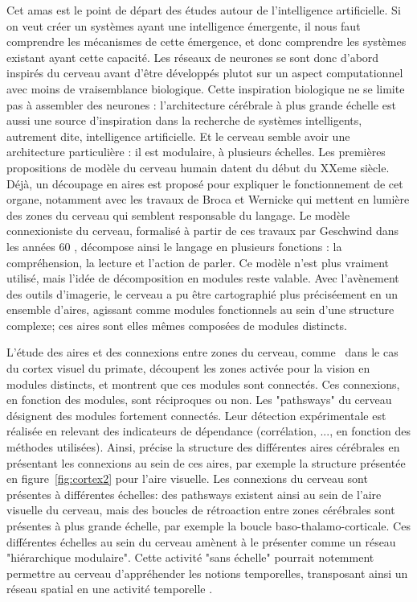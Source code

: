 Cet amas est le point de départ des études autour de l’intelligence artificielle. Si on veut créer un systèmes ayant une intelligence émergente, il nous faut comprendre les mécanismes de cette émergence, et donc comprendre les systèmes existant ayant cette capacité. Les réseaux de neurones se sont donc d’abord inspirés du cerveau avant d’être développés plutot sur un aspect computationnel avec moins de vraisemblance biologique.
Cette inspiration biologique ne se limite pas à assembler des neurones : l’architecture cérébrale à plus grande échelle est aussi une source d’inspiration dans la recherche de systèmes intelligents, autrement dite, intelligence artificielle.  
Et le cerveau semble avoir une architecture particulière : il est modulaire, à plusieurs échelles. 
Les premières propositions de modèle du cerveau humain datent du début du XXeme siècle. Déjà, un découpage en aires est proposé pour expliquer le fonctionnement de cet organe, notamment avec les travaux de Broca et Wernicke qui mettent en lumière des zones du cerveau qui semblent responsable du langage. Le modèle connexioniste du cerveau, formalisé à partir de ces travaux par Geschwind dans les années 60 , décompose ainsi le langage en plusieurs fonctions : la compréhension, la lecture et l'action de parler. Ce modèle n'est plus vraiment utilisé, mais l'idée de décomposition en modules reste valable.
Avec l'avènement des outils d'imagerie, le cerveau a pu être cartographié plus préciséement en un ensemble d'aires, agissant comme modules fonctionnels au sein d'une structure complexe; ces aires sont elles mêmes composées de modules distincts. 

L'étude des aires et des connexions entre zones du cerveau, comme~\cite{primate_cortex_91} dans le cas du cortex visuel du primate, découpent les zones activée pour la vision en modules distincts, et montrent que ces modules sont connectés. Ces connexions, en fonction des modules, sont réciproques ou non. Les "pathsways" du cerveau désignent des modules fortement connectés. Leur détection expérimentale est réalisée en relevant des indicateurs de dépendance (corrélation, ..., en fonction des méthodes utilisées). Ainsi, \cite{Rolls2002ComputationalNO} précise la structure des différentes aires cérébrales en présentant les connexions au sein de ces aires, par exemple la structure présentée en figure~\ref{fig:cortex2} pour l'aire visuelle. 
Les connexions du cerveau sont présentes à différentes échelles: des pathsways existent ainsi au sein de l'aire visuelle du cerveau, mais des boucles de rétroaction entre zones cérébrales sont présentes à plus grande échelle, par exemple la boucle baso-thalamo-corticale. Ces différentes échelles au sein du cerveau amènent \cite{Meunier2010ModularAH} à le présenter comme un réseau "hiérarchique modulaire". Cette activité "sans échelle" pourrait notemment permettre au cerveau d'appréhender les notions temporelles, transposant ainsi un réseau spatial en une activité temporelle \cite{biyu_scale-free_2014}.

